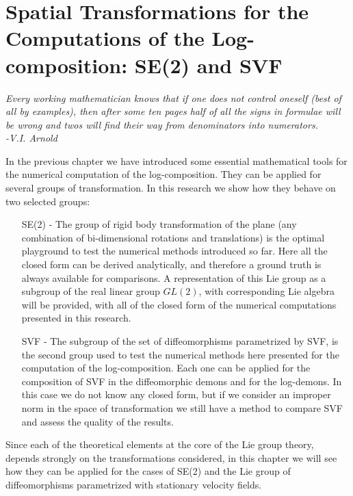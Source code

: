 \chapter{Spatial Transformations for the Computations of the Log-composition: SE(2) and SVF}\label{ch:spatial_transformations}


\begin{flushright}
	\emph{Every working mathematician knows that if one does not control oneself (best of all by examples), then after some ten pages half of all the signs in formulae will be wrong and twos will find their way from denominators into numerators. \\ -V.I. Arnold}
\end{flushright}

In the previous chapter we have introduced some essential mathematical tools for the numerical computation of the log-composition. They can be applied for several groups of transformation. In this research we show how they behave on two selected groups:
\begin{enumerate}
	\item[SE(2) -] The group of rigid body transformation of the plane (any combination of bi-dimensional rotations and translations) is the optimal playground to test the numerical methods introduced so far. Here all the closed form can be derived analytically, and therefore a ground truth is always available for comparisons. A representation of this Lie group as a subgroup of the real linear group $GL(2)$, with corresponding Lie algebra will be provided, with all of the closed form of the numerical computations presented in this research.
	\item[SVF -] The subgroup of the set of diffeomorphisms parametrized by SVF, is the second group used to test the numerical methods here presented for the computation of the log-composition. Each one can be applied for the composition of SVF in the diffeomorphic demons and for the log-demons. In this case we do not know any closed form, but if we consider an improper norm in the space of transformation we still have a method to compare SVF and assess the quality of the results.
\end{enumerate}

\noindent
Since each of the theoretical elements at the core of the Lie group theory, depends strongly on the transformations considered, in this chapter we will see how they can be applied for the cases of SE(2) and the Lie group of diffeomorphisms parametrized with stationary velocity fields.

